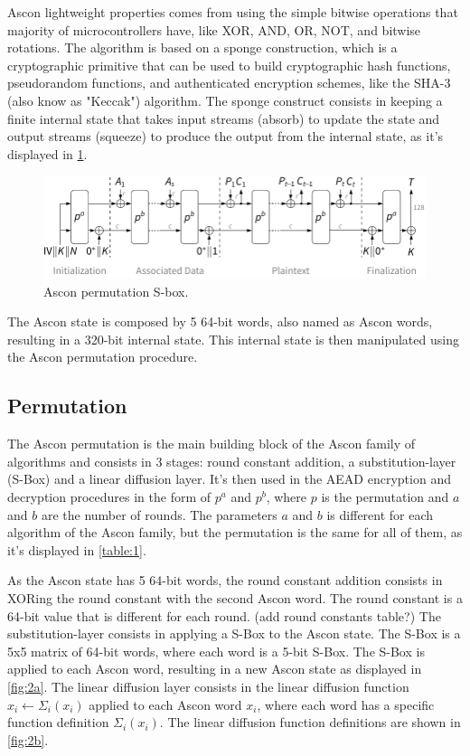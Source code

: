 \documentclass[11pt,twoside]{article}
\begin{document}
Ascon lightweight properties comes from using the simple bitwise operations that majority of microcontrollers have, like XOR, AND, OR, NOT, and bitwise rotations. The algorithm is based on a sponge construction, which is a cryptographic primitive that can be used to build cryptographic hash functions, pseudorandom functions, and authenticated encryption schemes, like the SHA-3 (also know as "Keccak") \cite{bertoni2015keccak} algorithm. The sponge construct consists in keeping a finite internal state that takes input streams (absorb) to update the state and output streams (squeeze) to produce the output from the internal state, as it's displayed in \cref{fig:1}.

\begin{figure}[h]
  \centering
  \includegraphics[scale=0.8]{assets/aead_encrypt.pdf}
  \caption{Ascon permutation S-box.}
  \label{fig:1}
\end{figure}

The Ascon state is composed by 5 64-bit words, also named as Ascon words, resulting in a 320-bit internal state. This internal state is then manipulated using the Ascon permutation procedure.

\subsection{Permutation}

The Ascon permutation is the main building block of the Ascon family of algorithms and consists in 3 stages: round constant addition, a substitution-layer (S-Box) and a linear diffusion layer. It's then used in the AEAD encryption and decryption procedures in the form of $p^a$ and $p^b$, where $p$ is the permutation and $a$ and $b$ are the number of rounds. The parameters $a$ and $b$ is different for each algorithm of the Ascon family, but the permutation is the same for all of them, as it's displayed in \cref{table:1}.

As the Ascon state has 5 64-bit words, the round constant addition consists in XORing the round constant with the second Ascon word. The round constant is a 64-bit value that is different for each round. \color{orange} (add round constants table?) \color{black} The substitution-layer consists in applying a S-Box to the Ascon state. The S-Box is a 5x5 matrix of 64-bit words, where each word is a 5-bit S-Box. The S-Box is applied to each Ascon word, resulting in a new Ascon state as displayed in \cref{fig:2a}. The linear diffusion layer consists in the linear diffusion function $x_i \leftarrow \Sigma_i(x_i)$ applied to each Ascon word $x_i$, where each word has a specific function definition $\Sigma_i(x_i)$. The linear diffusion function definitions are shown in \cref{fig:2b}.
\end{document}

